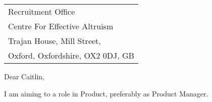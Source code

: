 \begin{tabular}{@{} l}
    Recruitment Office \\
	Centre For Effective Altruism \\
	Trajan House, Mill Street,  \\
	Oxford, Oxfordshire, OX2 0DJ, GB
\end{tabular}

\bigskip %


Dear Caitlin,
\bigskip %


I am aiming to a role in Product, preferably as Product Manager. 
% 

